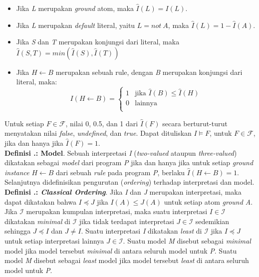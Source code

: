 \begin{itemize}
	\item Jika \textit{L} merupakan \textit{ground} atom, maka $\hat{I}(L) = I(L)$.
	\item Jika \textit{L} merupakan \textit{default} literal, yaitu $L = not \ A$, maka $\hat{I}(L) = 1 - \hat{I}(A)$.
	\item Jika \textit{S} dan \textit{T} merupakan konjungsi dari literal, maka $\hat{I}(S,T)=min(\hat{I}(S),\hat{I}(T))$
	\item Jika $H \leftarrow B$ merupakan sebuah rule, dengan \textit{B} merupakan konjungsi dari literal, maka:
	\begin{displaymath}
	I(H \leftarrow B) = 
	\begin{cases}
	1 & \text{jika $\hat{I}(B) \leq \hat{I}(H)$} \\
	0 & \text{lainnya} \\
	\end{cases}
	\end{displaymath}
\end{itemize}

\noindent Untuk setiap $F \in \mathcal{F}$, nilai 0, 0.5, dan 1 dari $\hat{I}(F)$ secara berturut-turut menyatakan nilai \textit{false}, \textit{undefined}, dan \textit{true}. Dapat dituliskan $I \models F$, untuk $F \in \mathcal{F}$, jika dan hanya jika $\hat{I}(F) = 1$.
\\

\noindent \textbf{Definisi \thebabDuaNum.\thedefBabDua: Model}. Sebuah interpretasi \textit{I} (\textit{two-valued} ataupun \textit{three-valued}) dikatakan sebagai \textit{model} dari program \textit{P} jika dan hanya jika untuk setiap \textit{ground instance} $H \leftarrow B$ dari sebuah \textit{rule} pada program \textit{P}, berlaku $\hat{I}(H \leftarrow B) = 1$.  
\\

Selanjutnya didefinisikan pengurutan (\textit{ordering}) terhadap interpretasi dan model.
\\

\noindent \textbf{Definisi \thebabDuaNum.\thedefBabDua: \textit{Classical Ordering}}. Jika \textit{I} dan \textit{J} merupakan interpretasi, maka dapat dikatakan bahwa $I \preceq J$ jika $I(A) \leq J(A)$ untuk setiap atom \textit{ground A}. Jika $\mathcal{I}$ merupakan kumpulan interpretasi, maka suatu interpretasi $I \in \mathcal{I}$ dikatakan \textit{minimal} di $\mathcal{I}$ jika tidak terdapat interpretasi $J \in \mathcal{I}$ sedemikian sehingga $J \preceq I$ dan $J \neq I$. Suatu interpretasi \textit{I} dikatakan \textit{least} di $\mathcal{I}$ jika $I \preceq J$ untuk setiap interpretasi lainnya $J \in \mathcal{I}$. Suatu model \textit{M} disebut sebagai \textit{minimal} model jika model tersebut \textit{minimal} di antara seluruh model untuk \textit{P}. Suatu model \textit{M} disebut sebagai \textit{least} model jika model tersebut \textit{least} di antara seluruh model untuk \textit{P}.
\\

